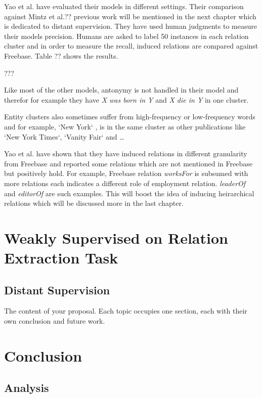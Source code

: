 \documentclass[12pt]{report}
\begin{document}
Yao et al. have evaluated their models in different settings. Their comparison against Mintz et al.?? previous work
 will be mentioned in the next chapter which is dedicated to distant supervision. They have used human judgments 
 to measure their models precision. Humans are asked to label 50 instances in each relation cluster and in order to measure
 the recall, induced relations are compared against Freebase. Table ?? shows the results.
 
 ???
 
 Like most of the other models, antonymy is not handled in their model and therefor for example they have
 \emph{X was born in Y} and \emph{X die in Y} in one cluster.
 
 Entity clusters also sometimes suffer from high-frequency or low-frequency words and for example, `New York`
 , is in the same cluster as other publications like `New York Times`, `Vanity Fair` and \ldots
 
 Yao et al. have shown that they have induced relations in different granularity from Freebase and reported some relations
 which are not mentioned in Freebase but positively hold. For example, Freebase relation \emph{worksFor}
  is subsumed with more relations each indicates a different role of employment relation. \emph{leaderOf}
   and \emph{editorOf} are such examples. This will boost the idea of inducing heirarchical 
   relations which will be discussed more in the last chapter.
 
 

\chapter{Weakly Supervised on Relation Extraction Task}
\label{ch:related}

\section{Distant Supervision}
\label{ch:weakly supervised}

The content of \cite{Huang2012} your proposal. Each topic occupies one section, each
with their own conclusion and future work.

\chapter{Conclusion}
\label{ch:conclusion}

\section{Analysis}
\label{ch:conclusion}
\end{document}
